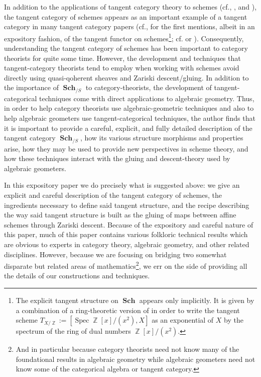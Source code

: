 \documentclass{amsart}
\theoremstyle{definition}
\DeclareMathOperator{\Z}{\mathbb{Z}}
\DeclareMathOperator{\Spec}{Spec}
\DeclareMathOperator{\Sch}{\mathbf{Sch}}
\numberwithin{equation}{subsection}
\begin{document}
In addition to the applications of tangent category theory to schemes (cf.\@ \cite{GeoffJSDiffBunComAlg}, \cite{GeoffJSElias}, and \cite{JSMeMapFlavoursInTanCats}), the tangent category of schemes appears as an important example of a tangent category in many tangent category papers (cf.\@ \cite{GeoffRobinDiffStruct}, \cite{GeoffRobinBundle} for the first mentions, albeit in an expository fashion, of the tangent functor on schemes\footnote{The explicit tangent structure on $\Sch$ appears only implicitly. It is given by a combination of a ring-theoretic version of \cite[Proposition 5.16, Proposition 5.17, Corollary 5.18]{GeoffRobinDiffStruct} in order to write the tangent scheme $T_{X/\Z} := [\Spec \Z[x]/(x^2),X]$ as an exponential of $X$ by the spectrum of the ring of dual numbers $\Z[x]/(x^2)$.}; cf. \cite[Example 2.iii]{GarnerEmbeddingTanCat} or \cite[Section 6]{DoretteMe}). Consequently, understanding the tangent category of schemes has been important to category theorists for quite some time. However, the development and techniques that tangent-category theorists tend to employ when working with schemes avoid directly using quasi-qoherent sheaves and Zariski descent/gluing. In addition to the importance of $\Sch_{/S}$ to category-theorists, the development of tangent-categorical techniques come with direct applications to algebraic geometry. Thus, in order to help category theorists use algebraic-geometric techniques and also to help algebraic geometers use tangent-categorical techniques, the author finds that it is important to provide a careful, explicit, and fully detailed description of the tangent category $\Sch_{/S}$, how its various structure morphisms and properties arise, how they may be used to provide new perspectives in scheme theory, and how these techniques interact with the gluing and descent-theory used by algebraic geometers.

In this expository paper we do precisely what is suggested above: we give an explicit and careful description of the tangent category of schemes, the ingredients necessary to define said tangent structure, and the recipe describing the way said tangent structure is built as the gluing of maps between affine schemes through Zariski descent. Because of the expository and careful nature of this paper, much of this paper contains various folkloric technical results which are obvious to experts in category theory, algebraic geometry, and other related disciplines. However, because we are focusing on bridging two somewhat disparate but related areas of mathematics\footnote{And in particular because category theorists need not know many of the foundational results in algebraic geometry while algebraic geometers need not know some of the categorical algebra or tangent category.}, we err on the side of providing all the details of our constructions and techniques.%
\end{document}

